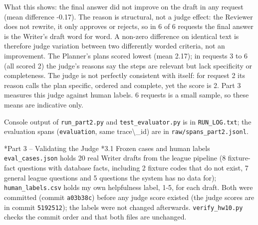 \documentclass[11pt]{article}
\makeatletter
\renewcommand\section{\@startsection{section}{1}{\z@}{-3.0ex \@plus -1ex \@minus -.2ex}{1.2ex \@plus.2ex}{\normalfont\fontsize{14}{17}\selectfont\bfseries}}
\renewcommand\subsection{\@startsection{subsection}{2}{\z@}{-2.2ex \@plus -1ex \@minus -.2ex}{0.8ex \@plus.2ex}{\normalfont\fontsize{12}{14.5}\selectfont\bfseries}}
\makeatother
\begin{document}
What this shows: the final answer did not improve on the draft in any request (mean difference -0.17). The reason is structural, not a judge effect: the Reviewer does not rewrite, it only approves or rejects, so in 6 of 6 requests the final answer is the Writer's draft word for word. A non-zero difference on identical text is therefore judge variation between two differently worded criteria, not an improvement. The Planner's plans scored lowest (mean 2.17); in requests 3 to 6 (all scored 2) the judge's reasons say the steps are relevant but lack specificity or completeness. The judge is not perfectly consistent with itself: for request 2 its reason calls the plan specific, ordered and complete, yet the score is 2. Part 3 measures this judge against human labels. 6 requests is a small sample, so these means are indicative only.

Console output of \texttt{run\_\allowbreak{}part2.py} and \texttt{test\_\allowbreak{}evaluator.py} is in \texttt{RUN\_\allowbreak{}LOG.txt}; the evaluation spans (\texttt{evaluation}, same trace\textbackslash{}\_\allowbreak{}id) are in \texttt{raw/\allowbreak{}spans\_\allowbreak{}part2.jsonl}.

\section*{Part 3 -- Validating the Judge}
\subsection*{3.1 Frozen cases and human labels}
\texttt{eval\_\allowbreak{}cases.json} holds 20 real Writer drafts from the league pipeline (8 fixture-fact questions with database facts, including 2 fixture codes that do not exist, 7 general league questions and 5 questions the system has no data for); \texttt{human\_\allowbreak{}labels.csv} holds my own helpfulness label, 1-5, for each draft. Both were committed (commit \texttt{a03b38c}) before any judge score existed (the judge scores are in commit \texttt{5192512}); the labels were not changed afterwards. \texttt{verify\_\allowbreak{}hw10.py} checks the commit order and that both files are unchanged.
\end{document}
